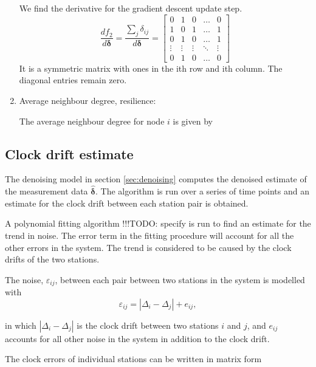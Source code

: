 \documentclass[12pt,a4paper,english]{article}
\newcommand\todo[1]{{\color{red}!!!TODO: #1}}
\begin{document}
\begin{enumerate}
We find the derivative for the gradient descent update step.
\begin{equation}
\frac{df_2}{d\bm{\delta}}=\frac{\sum_j\delta_{ij}}{d\bm{\delta}}=
\begin{bmatrix}
    0 & 1 & 0 & \dots  & 0 \\
    1 & 0 & 1 & \dots  & 1 \\
    0 & 1 & 0 & \dots  & 1 \\
    \vdots & \vdots & \vdots & \ddots & \vdots \\
    0 & 1 & 0 & \dots  & 0
\end{bmatrix}
\end{equation}
It is a symmetric matrix with ones in the ith row and ith column. The diagonal entries remain zero.





 
\item Average neighbour degree, resilience: 

The average neighbour degree for node $i$ is given by

\end{enumerate}

\subsection{Clock drift estimate}

The denoising model in section \ref{sec:denoising} computes the denoised estimate of the measurement data $\bm{\hat{\delta}}$. The algorithm is run over a series of time points and an estimate for the clock drift between each station pair is obtained. 

A polynomial fitting algorithm \todo{specify} is run to find an estimate for the trend in noise. The error term in the fitting procedure will account for all the other errors in the system. The trend is considered to be caused by the clock drifts of the two stations. 

The noise, $\varepsilon_{ij}$, between each pair between two stations in the system is modelled with 
\begin{equation}
\varepsilon_{ij} = | \Delta_i - \Delta_j | + e_{ij},
\end{equation}

in which $ | \Delta_i - \Delta_j | $ is the clock drift between two stations $i$ and $j$, and $e_{ij}$ accounts for all other noise in the system in addition to the clock drift. 

The clock errors of individual stations can be written in matrix form 
\end{document}
